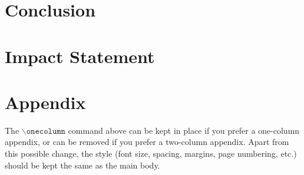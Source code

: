 \documentclass{article}
\theoremstyle{plain}
\theoremstyle{definition}
\theoremstyle{remark}
\begin{document}
\section{Conclusion}
\label{conclusion}




\section*{Impact Statement}
\label{Imapact Statement}

\nocite{*}




\newpage
\appendix
\onecolumn
\section{Appendix}

The $\mathtt{\backslash onecolumn}$ command above can be kept in place if you prefer a one-column appendix, or can be removed if you prefer a two-column appendix.  Apart from this possible change, the style (font size, spacing, margins, page numbering, etc.) should be kept the same as the main body.
\end{document}
